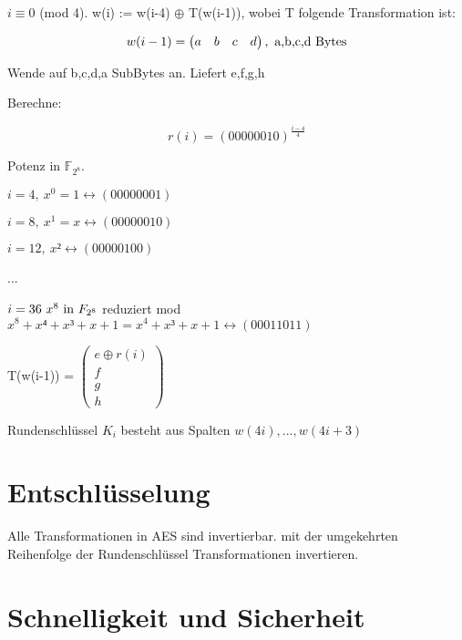 $i \equiv 0$ (mod 4). w(i) := w(i-4) $\oplus$ T(w(i-1)), wobei T folgende Transformation ist:

\begin{equation}
  w(i-1) = \begin{pmatrix}a & b & c & d \end{pmatrix}, \textnormal{ a,b,c,d Bytes}
\end{equation}

Wende auf b,c,d,a SubBytes an. Liefert e,f,g,h 

\par \medskip

Berechne:

\begin{equation}
  r(i) = (00000010)^{\frac{i-4}{4}}
\end{equation}

Potenz in $\mathbb{F}_{2^8}$.

$i=4, \ x^0 = 1 \leftrightarrow (00000001)$ 

$i=8, \ x^1 = x \leftrightarrow (00000010)$

$i=12, \ x² \leftrightarrow (00000100)$

...

$i=36 \  x^8 \textnormal{ in } F_{2^8}$ reduziert mod $x^8 + x⁴ + x³ + x + 1 = x^4 + x³ + x + 1 \leftrightarrow (00011011)$

\par \medskip

T(w(i-1)) = $\begin{pmatrix}e \oplus r(i) \\ f \\ g \\ h \end{pmatrix}$

\par \medskip

Rundenschlüssel $K_i$ besteht aus Spalten $w(4i),...,w(4i+3)$

\section{Entschlüsselung}

Alle Transformationen in AES sind invertierbar. mit der umgekehrten Reihenfolge der Rundenschlüssel Transformationen invertieren.

\section{Schnelligkeit und Sicherheit}

